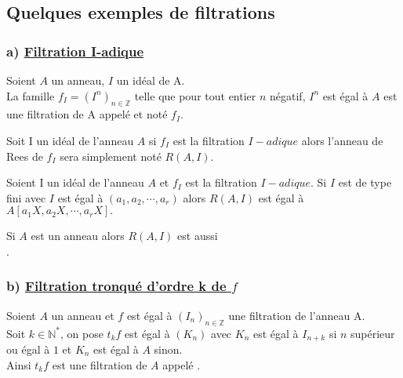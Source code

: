 \subsection{Quelques exemples de filtrations}
\subsubsection{a) \underline{Filtration I-adique}}
\begin{madefinition}
	Soient $A$ un anneau, $I$ un idéal de A.\\
	La famille $f_I = (I^n)_{n\in \mathbb{Z}}$ telle que pour tout  entier $n$ négatif, $I^n $ est égal à $  A$ est une filtration de A appelé  et noté $f_I.$
\end{madefinition}
\begin{maremarque}
	Soit I un idéal de l'anneau $A$ si $f_I$ est la filtration $I-adique$ alors l'anneau de Rees de $f_I$ sera simplement noté $R(A,I)$.
\end{maremarque}
\begin{maproposition}
	Soient I un idéal de l'anneau $A$ et $f_I$ est la filtration $I-adique$.
	Si $I$ est de type fini avec $I $ est égal à $  (a_1, a_2, \cdots, a_r)$ alors $R(A,I) $ est égal à $  A[a_1X,a_2X, \cdots, a_rX].$
\end{maproposition}
\begin{maconsequence}
	Si $A$ est un anneau  alors $R(A,I)$ est aussi \\ .
\end{maconsequence}


\subsubsection{b) \underline{Filtration tronqué d'ordre k de $f$}}
\begin{madefinition}
	Soient $A$ un anneau et $f $ est égal à $  (I_n)_{n\in \mathbb{Z}}$ une filtration de l'anneau A.\\
	Soit $k \in \mathbb{N}^{*}$, on pose $t_{k}f$ est égal à $ (K_n)$ avec $K_n $ est égal à $ I_{n+k}$ si $n $ supérieur ou égal à $ 1 $ et $K_n $ est égal à $ A$ sinon.\\
	Ainsi $t_{k}f$ est une filtration de $A$ appelé .
\end{madefinition}

